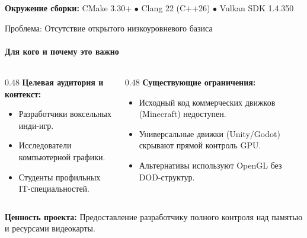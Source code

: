




\begin{frame}[plain]
  \titlepage
  \vspace{0.8em}
  \begin{center}
    \scriptsize\textcolor{projectvblue}{\textbf{Окружение сборки:}}
    CMake 3.30+ $\bullet$ Clang 22 (C++26) $\bullet$ Vulkan SDK 1.4.350
  \end{center}
\end{frame}

\begin{frame}{Проблема: Отсутствие открытого низкоуровневого базиса}
  \framesubtitle{Для кого и почему это важно}
  \begin{columns}[T]
    \begin{column}{0.48\textwidth}
      \textbf{Целевая аудитория и контекст:}
      \begin{itemize}
        \item Разработчики воксельных инди-игр.
        \item Исследователи компьютерной графики.
        \item Студенты профильных IT-специальностей.
      \end{itemize}
    \end{column}
    \begin{column}{0.48\textwidth}
      \textbf{Существующие ограничения:}
      \begin{itemize}
        \item {} Исходный код коммерческих движков (Minecraft) недоступен.
        \item {} Универсальные движки (Unity/Godot) скрывают прямой контроль GPU.
        \item {} Альтернативы используют OpenGL без DOD-структур.
      \end{itemize}
    \end{column}
  \end{columns}
  \vspace{1em}
  \begin{center}
    \textbf{Ценность проекта:} Предоставление разработчику полного контроля над памятью и ресурсами видеокарты.
  \end{center}
\end{frame}

